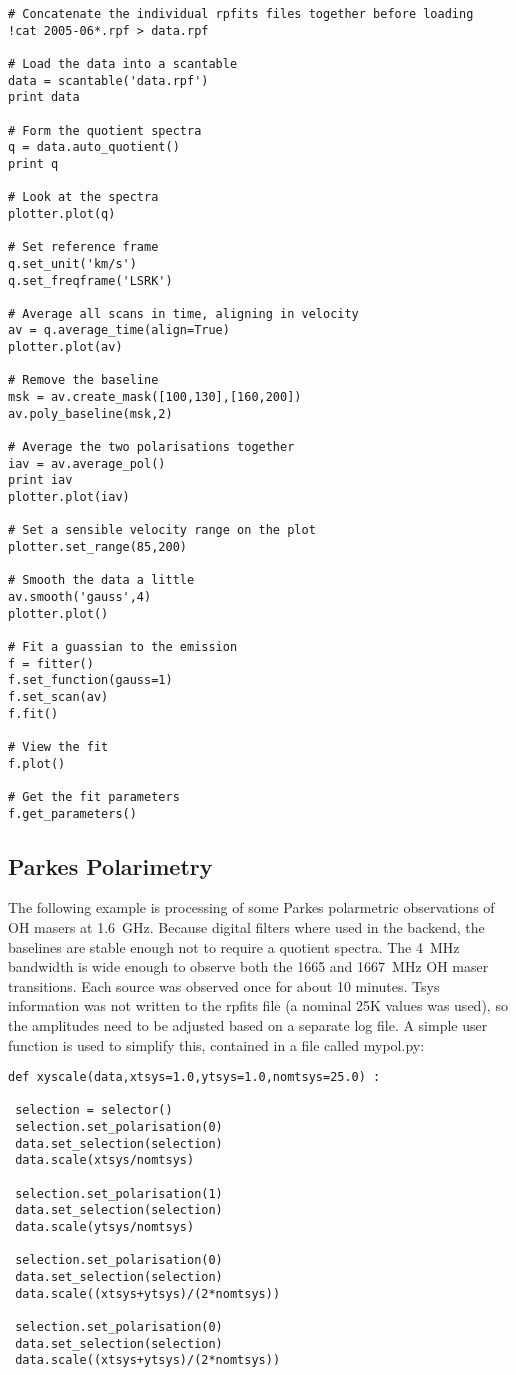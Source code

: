 \documentclass[11pt]{article}
\begin{document}
\begin{verbatim}
# Concatenate the individual rpfits files together before loading
!cat 2005-06*.rpf > data.rpf

# Load the data into a scantable
data = scantable('data.rpf')
print data

# Form the quotient spectra
q = data.auto_quotient()
print q

# Look at the spectra
plotter.plot(q)

# Set reference frame
q.set_unit('km/s')
q.set_freqframe('LSRK')

# Average all scans in time, aligning in velocity
av = q.average_time(align=True)
plotter.plot(av)

# Remove the baseline
msk = av.create_mask([100,130],[160,200])
av.poly_baseline(msk,2)

# Average the two polarisations together
iav = av.average_pol()
print iav
plotter.plot(iav)

# Set a sensible velocity range on the plot
plotter.set_range(85,200)

# Smooth the data a little
av.smooth('gauss',4)
plotter.plot()

# Fit a guassian to the emission
f = fitter()
f.set_function(gauss=1)
f.set_scan(av)
f.fit()

# View the fit
f.plot()

# Get the fit parameters
f.get_parameters()

\end{verbatim}


\subsection{Parkes Polarimetry}

The following example is processing
of some Parkes polarmetric observations of OH masers at
1.6~GHz. Because digital filters where used in the backend, the
baselines are stable enough not to require a quotient spectra. The
4~MHz bandwidth is wide enough to observe both the 1665 and 1667~MHz
OH maser transitions. Each source was observed once for about 10
minutes. Tsys information was not written to the rpfits file (a
nominal 25K values was used), so the amplitudes need to be adjusted
based on a separate log file. A simple user function is used to
simplify this, contained in a file called mypol.py:

\begin{verbatim}
def xyscale(data,xtsys=1.0,ytsys=1.0,nomtsys=25.0) :

 selection = selector()
 selection.set_polarisation(0)
 data.set_selection(selection)
 data.scale(xtsys/nomtsys)

 selection.set_polarisation(1)
 data.set_selection(selection)
 data.scale(ytsys/nomtsys)

 selection.set_polarisation(0)
 data.set_selection(selection)
 data.scale((xtsys+ytsys)/(2*nomtsys))

 selection.set_polarisation(0)
 data.set_selection(selection)
 data.scale((xtsys+ytsys)/(2*nomtsys))
\end{verbatim}
\end{document}
